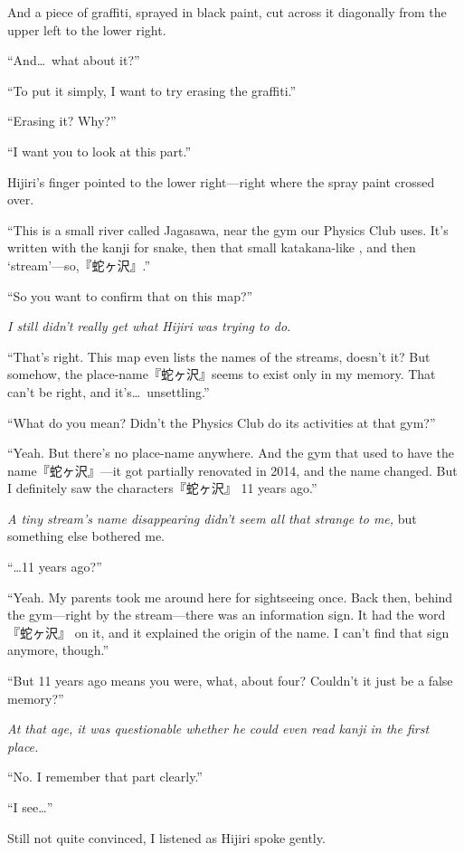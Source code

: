 \documentclass[
    a4paper,
    12pt,
    twoside,
    openany,
    UTF8,
    fontset=windows
]{ctexbook}
\begin{document}
And a piece of graffiti, sprayed in black paint, cut across it diagonally from the upper left to the lower right.

``And\dots\ what about it?''

``To put it simply, I want to try erasing the graffiti.''

``Erasing it? Why?''

``I want you to look at this part.''

Hijiri's finger pointed to the lower right---right where the spray paint crossed over.

``This is a small river called Jagasawa, near the gym our Physics Club uses. It's written with the kanji for snake, then that small katakana-like , and then `stream'---so,『蛇ヶ沢』.''

``So you want to confirm that on this map?''

\textit{I still didn't really get what Hijiri was trying to do.}

``That's right. This map even lists the names of the streams, doesn't it? But somehow, the place-name『蛇ヶ沢』seems to exist only in my memory. That can't be right, and it's\dots\ unsettling.''

``What do you mean? Didn't the Physics Club do its activities at that gym?''

``Yeah. But there's no place-name anywhere. And the gym that used to have the name『蛇ヶ沢』---it got partially renovated in 2014, and the name changed. But I definitely saw the characters『蛇ヶ沢』 11 years ago.''

\textit{A tiny stream's name disappearing didn't seem all that strange to me,} but something else bothered me.

``\dots 11 years ago?''

``Yeah. My parents took me around here for sightseeing once. Back then, behind the gym---right by the stream---there was an information sign. It had the word『蛇ヶ沢』 on it, and it explained the origin of the name. I can't find that sign anymore, though.''

``But 11 years ago means you were, what, about four? Couldn't it just be a false memory?''

\textit{At that age, it was questionable whether he could even read kanji in the first place.}

``No. I remember that part clearly.''

``I see\dots''

Still not quite convinced, I listened as Hijiri spoke gently.
\end{document}
